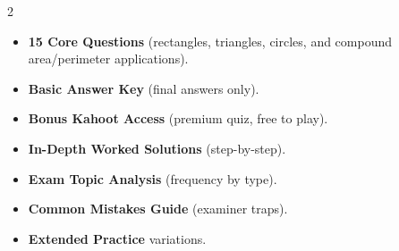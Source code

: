 \documentclass[11pt,a4paper]{article}
\newcommand{\FullReleaseDate}{April 30, 2026}
\begin{document}
\vspace{8pt}

\begin{multicols}{2}
  \begin{tcolorbox}[card, title=\sffamily\bfseries\textcolor{white}{\faHandPointDown\ TODAY (Simplified Version)}, colbacktitle=mainblue, boxed title style={sharp corners, boxrule=0pt}]
    \begin{itemize}[leftmargin=1.2em, itemsep=2pt]
      \item \small \textbf{15 Core Questions} (rectangles, triangles, circles, and compound area/perimeter applications).
      \item \small \textbf{Basic Answer Key} (final answers only).
      \item \small \textbf{Bonus Kahoot Access} (premium quiz, free to play).
    \end{itemize}
  \end{tcolorbox}

  \columnbreak

  \begin{tcolorbox}[card, title=\sffamily\bfseries\textcolor{white}{\faRocket\ ON \FullReleaseDate\ (Full Upgrade)}, colbacktitle=mainblue, boxed title style={sharp corners, boxrule=0pt}]
    \begin{itemize}[leftmargin=1.2em, itemsep=2pt]
      \item \small \textbf{In-Depth Worked Solutions} (step-by-step).
      \item \small \textbf{Exam Topic Analysis} (frequency by type).
      \item \small \textbf{Common Mistakes Guide} (examiner traps).
      \item \small \textbf{Extended Practice} variations.
    \end{itemize}
  \end{tcolorbox}
\end{multicols}
\end{document}
